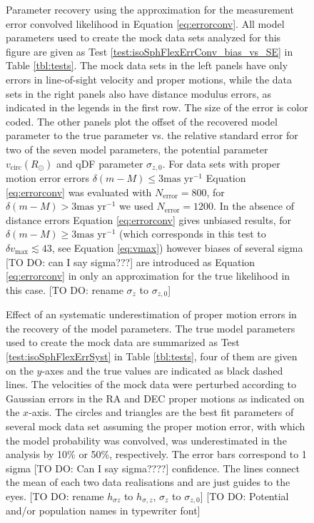 \addtocounter{figure}{-1}
\begin{figure} [t!]
\caption{Parameter recovery using the approximation for the measurement error convolved likelihood in Equation \ref{eq:errorconv}. All model parameters used to create the mock data sets analyzed for this figure are given as Test \ref{test:isoSphFlexErrConv_bias_vs_SE} in Table \ref{tbl:tests}. The mock data sets in the left panels have only errors in line-of-sight velocity and proper motions, while the data sets in the right panels also have distance modulus errors, as indicated in the legends in the first row. The size of the error is color coded. The other panels plot the offset of the recovered model parameter to the true parameter vs. the relative standard error for two of the seven model parameters, the potential parameter $v_\text{circ}(R_\odot)$ and qDF parameter $\sigma_{z,0}$. For data sets with proper motion error errors $\delta(m-M) \leq 3 \text{mas yr}^{-1}$ Equation \ref{eq:errorconv} was evaluated with $N_\text{error}=800$, for $\delta(m-M) > 3 \text{mas yr}^{-1}$ we used $N_\text{error}=1200$. In the absence of distance errors Equation \ref{eq:errorconv} gives unbiased results, for $\delta(m-M) \geq 3 \text{mas yr}^{-1}$ (which corresponds in this test to $\delta v_\text{max} \lesssim 43$, see Equation \ref{eq:vmax}) however biases of several sigma [TO DO: can I say sigma???] are introduced as Equation \ref{eq:errorconv} in only an approximation for the true likelihood in this case. [TO DO: rename  $\sigma_z$ to $\sigma_{z,0}$]}
\label{fig:isoSphFlexErrConv_bias_vs_SE}
\end{figure}





\begin{figure}
\caption{Effect of an systematic underestimation of proper motion errors in the recovery of the model parameters. The true model parameters used to create the mock data are summarized as Test \ref{test:isoSphFlexErrSyst} in Table \ref{tbl:tests}, four of them are given on the $y$-axes and the true values are indicated as black dashed lines. The velocities of the mock data were perturbed according to Gaussian errors in the RA and DEC proper motions as indicated on the $x$-axis.   The circles and triangles are the best fit parameters of several mock data set assuming the proper motion error, with which the model probability was convolved, was underestimated in the analysis by 10\% or 50\%, respectively. The error bars correspond to 1 sigma [TO DO: Can I say sigma????] confidence. The lines connect the mean of each two data realisations and are just guides to the eyes. [TO DO: rename $h_{\sigma z}$ to $h_{\sigma,z}$, $\sigma_z$ to $\sigma_{z,0}$] [TO DO: Potential and/or population names in typewriter font]}
\label{fig:isoSphFlexErrSyst}
\end{figure}

